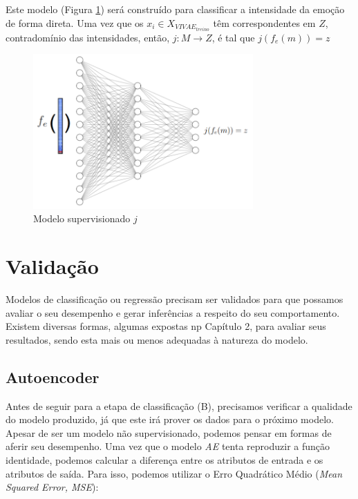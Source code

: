 Este modelo (Figura \ref{fig:jsupervisionado}) será construído para classificar a intensidade da emoção de forma direta. Uma vez que os $x_i \in X_{VIVAE_{treino}}$ têm correspondentes em $Z$, contradomínio das intensidades, então, $j: M \rightarrow Z$, é tal que $j(f_e(m)) = z$

\begin{figure}[h]
    \centering
    \includegraphics[width=0.75\textwidth]{img/p-supervisionado.png}
    \caption{\label{fig:jsupervisionado}Modelo supervisionado $j$}
\end{figure}

\section{Validação}

Modelos de classificação ou regressão precisam ser validados para que possamos avaliar o seu desempenho e gerar inferências a respeito do seu comportamento. Existem diversas formas, algumas expostas np Capítulo 2, para avaliar seus resultados, sendo esta mais ou menos adequadas à natureza do modelo.

\subsection{Autoencoder}

Antes de seguir para a etapa de classificação (B), precisamos verificar a qualidade do modelo produzido, já que este irá prover os dados para o próximo modelo. Apesar de ser um modelo não supervisionado, podemos pensar em formas de aferir seu desempenho. Uma vez que o modelo \textit{AE} tenta reproduzir a função identidade, podemos calcular a diferença entre os atributos de entrada e os atributos de saída. Para isso, podemos utilizar o Erro Quadrático Médio (\textit{Mean Squared Error, MSE}):

